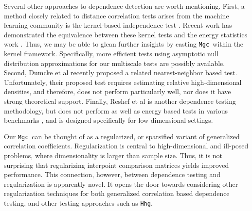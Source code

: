 \documentclass[11pt]{article}
\providecommand{\sct}[1]{{\sc \texttt{#1}}}
\newcommand{\Mgc}{\sct{Mgc}}
\newcommand{\Hhg}{\sct{Hhg}}
\begin{document}
Several other approaches to dependence detection are worth mentioning.
First, a method closely related to distance correlation tests arises from the machine learning community is the kernel-based independence test  \cite{GrettonEtAl2005, GrettonGyorfi2010, GrettonEtAl2012}.  Recent work has demonstrated the equivalence between these kernel tests and the energy statistics work \cite{SejdinovicEtAl2013, RamdasEtAl2015}. Thus, we may be able to glean further insights by casting \Mgc~within the kernel framework. Specifically, more efficient tests using asymptotic null distribution approximations for our multiscale tests are possibly available.
Second, Dumcke et al \cite{Dumcke2014} recently proposed a related nearest-neighbor based test.  Unfortunately, their proposed test requires estimating relative high-dimensional densities, and therefore, does not perform particularly well, nor does it have strong theoretical support.
Finally, Reshef et al \cite{Reshef2011} is another dependence testing methodology, but does not perform as well as energy based tests in various benchmarks \cite{SimonTibshirani2012}, and is designed specifically for low-dimensional settings.

Our \Mgc~can be thought of as a regularized, or sparsified variant of generalized correlation coefficients.  Regularization is central to high-dimensional and ill-posed problems, where dimensionality is larger than sample size.  Thus, it is not surprising that regularizing interpoint comparison matrices yields improved performance.  This connection, however, between dependence testing and regularization is apparently novel.  It opens the door towards considering other regularization techniques for both generalized correlation based dependence testing, and other testing approaches such as \Hhg. 




\end{document}
